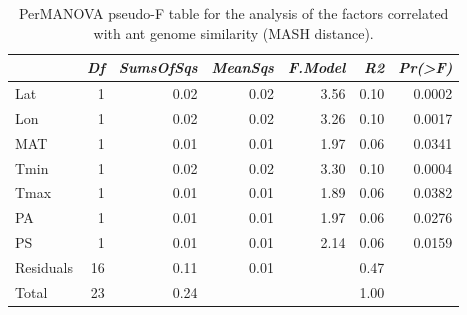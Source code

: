 \begin{table}[ht]
\centering
\begin{tabular}{lrrrrrr}
  \hline
 & {\emph{Df}} & {\emph{SumsOfSqs}} & {\emph{MeanSqs}} & {\emph{F.Model}} & {\emph{R2}} & {\emph{Pr(>F)}} \\ 
  \hline
Lat & 1 & 0.02 & 0.02 & 3.56 & 0.10 & 0.0002 \\ 
  Lon & 1 & 0.02 & 0.02 & 3.26 & 0.10 & 0.0017 \\ 
  MAT & 1 & 0.01 & 0.01 & 1.97 & 0.06 & 0.0341 \\ 
  Tmin & 1 & 0.02 & 0.02 & 3.30 & 0.10 & 0.0004 \\ 
  Tmax & 1 & 0.01 & 0.01 & 1.89 & 0.06 & 0.0382 \\ 
  PA & 1 & 0.01 & 0.01 & 1.97 & 0.06 & 0.0276 \\ 
  PS & 1 & 0.01 & 0.01 & 2.14 & 0.06 & 0.0159 \\ 
  Residuals & 16 & 0.11 & 0.01 &  & 0.47 &  \\ 
  Total & 23 & 0.24 &  &  & 1.00 &  \\ 
   \hline
\end{tabular}
\caption{PerMANOVA pseudo-F table for the analysis of the factors 
correlated with ant genome similarity (MASH distance).} 
\label{tab:perm_mash}
\end{table}
